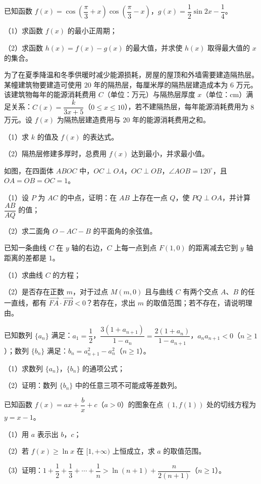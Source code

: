 \begin{question}
已知函数 $f(x)=\cos\left(\dfrac\pi3+x\right)\cos\left(\dfrac\pi3-x\right)$，$g(x)=\dfrac12\sin2x-\dfrac14$。

（1）求函数 $f(x)$ 的最小正周期；

（2）求函数 $h(x)=f(x)-g(x)$ 的最大值，并求使 $h(x)$ 取得最大值的 $x$ 的集合。

\end{question}
\begin{question}
为了在夏季降温和冬季供暖时减少能源损耗，房屋的屋顶和外墙需要建造隔热层。某幢建筑物要建造可使用 $20$ 年的隔热层，每厘米厚的隔热层建造成本为 $6$ 万元。该建筑物每年的能源消耗费用 $C$（单位：万元）与隔热层厚度 $x$（单位：cm）满足关系：$C(x)=\dfrac{k}{3x+5}$（$0\leqslant x\leqslant10$），若不建隔热层，每年能源消耗费用为 $8$ 万元。设 $f(x)$ 为隔热层建造费用与 $20$ 年的能源消耗费用之和。

（1）求 $k$ 的值及 $f(x)$ 的表达式。

（2）隔热层修建多厚时，总费用 $f(x)$ 达到最小，并求最小值。

\Needspace{0.4\textheight}
\end{question}
\begingroup
\renewenvironment{question}{\Needspace{0.5\textheight}}{}
\begin{question}
如图，在四面体 $ABOC$ 中，$OC\perp OA$，$OC\perp OB$，$\angle AOB=120^\circ$，且 $OA=OB=OC=1$。

（1）设 $P$ 为 $AC$ 的中点，证明：在 $AB$ 上存在一点 $Q$，使 $PQ\perp OA$，并计算 $\dfrac{AB}{AQ}$ 的值；

（2）求二面角 $O-AC-B$ 的平面角的余弦值。
\nopagebreak[4]
\begin{center}\end{center}
\nopagebreak[4]
\end{question}
\endgroup
\begin{question}
已知一条曲线 $C$ 在 $y$ 轴的右边，$C$ 上每一点到点 $F(1,0)$ 的距离减去它到 $y$ 轴距离的差都是 $1$。

（1）求曲线 $C$ 的方程；

（2）是否存在正数 $m$，对于过点 $M(m,0)$ 且与曲线 $C$ 有两个交点 $A$、$B$ 的任一直线，都有 $\overrightarrow{FA}\cdot\overrightarrow{FB}<0$？若存在，求出 $m$ 的取值范围；若不存在，请说明理由。

\end{question}
\begin{question}
已知数列 $\{a_n\}$ 满足：$a_1=\dfrac12$，$\dfrac{3(1+a_{n+1})}{1-a_n}=\dfrac{2(1+a_n)}{1-a_{n+1}}$，$a_na_{n+1}<0$（$n\geqslant1$）；数列 $\{b_n\}$ 满足：$b_n=a_{n+1}^2-a_n^2$（$n\geqslant1$）。

（1）求数列 $\{a_n\}$，$\{b_n\}$ 的通项公式；

（2）证明：数列 $\{b_n\}$ 中的任意三项不可能成等差数列。

\end{question}
\begin{question}
已知函数 $f(x)=ax+\dfrac bx+c$（$a>0$）的图象在点 $(1,f(1))$ 处的切线方程为 $y=x-1$。

（1）用 $a$ 表示出 $b$，$c$；

（2）若 $f(x)\geqslant\ln x$ 在 $[1,+\infty)$ 上恒成立，求 $a$ 的取值范围。

（3）证明：$1+\dfrac12+\dfrac13+\cdots+\dfrac1n>\ln(n+1)+\dfrac{n}{2(n+1)}$（$n\geqslant1$）。

\end{question}